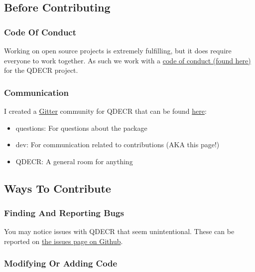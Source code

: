 \documentclass[]{article}
\providecommand{\tightlist}{%
  \setlength{\itemsep}{0pt}\setlength{\parskip}{0pt}}
\begin{document}
\hypertarget{before-contributing}{%
\subsection{Before Contributing}\label{before-contributing}}

\hypertarget{code-of-conduct}{%
\subsubsection{Code Of Conduct}\label{code-of-conduct}}

Working on open source projects is extremely fulfilling, but it does
require everyone to work together. As such we work with a
\href{code-of-conduct.html}{code of conduct (found here)} for the QDECR
project.

\hypertarget{communication}{%
\subsubsection{Communication}\label{communication}}

I created a \href{https://gitter.im}{Gitter} community for QDECR that
can be found \href{https://gitter.im/QDECR/}{here}:

\begin{itemize}
\tightlist
\item
  questions: For questions about the package
\item
  dev: For communication related to contributions (AKA this page!)
\item
  QDECR: A general room for anything
\end{itemize}

\hypertarget{ways-to-contribute}{%
\subsection{Ways To Contribute}\label{ways-to-contribute}}

\hypertarget{finding-and-reporting-bugs}{%
\subsubsection{Finding And Reporting
Bugs}\label{finding-and-reporting-bugs}}

You may notice issues with QDECR that seem unintentional. These can be
reported on \href{https://github.com/slamballais/QDECR/issues}{the
issues page on Github}.

\hypertarget{modifying-or-adding-code}{%
\subsubsection{Modifying Or Adding
Code}\label{modifying-or-adding-code}}
\end{document}
